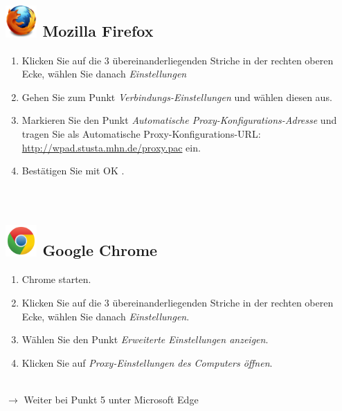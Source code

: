 \documentclass[a4paper,12pt]{scrartcl}
\begin{document}
\subsection*{\includegraphics[height=1.2cm,keepaspectratio]{Bilder/Firefox_35_logo} Mozilla Firefox}
\begin{enumerate}
	\item Klicken Sie auf die 3 übereinanderliegenden Striche in der rechten oberen Ecke, wählen Sie danach \emph{Einstellungen}
	\item Gehen Sie zum Punkt \emph{Verbindungs-Einstellungen} und wählen diesen aus.
	\item Markieren Sie den Punkt \emph{Automatische Proxy-Konfigurations-Adresse} und tragen Sie als Automatische Proxy-Konfigurations-URL: \\ \url{http://wpad.stusta.mhn.de/proxy.pac} ein.
	\item Bestätigen Sie mit OK .\\
	\\
	\\
\end{enumerate}





\subsection*{\includegraphics[height=1.2cm,keepaspectratio]{Bilder/Chrome_2011_logo} Google Chrome}
\begin{enumerate}
	\item Chrome starten.
	\item Klicken Sie auf die 3 übereinanderliegenden Striche in der rechten oberen Ecke, wählen Sie danach \emph{Einstellungen}.
	\item Wählen Sie den Punkt \emph{Erweiterte Einstellungen anzeigen}.
	\item Klicken Sie auf \emph{Proxy-Einstellungen des Computers öffnen}.
	\\
	\\
\end{enumerate}
$\rightarrow$ Weiter bei Punkt 5 unter Microsoft Edge
\end{document}
